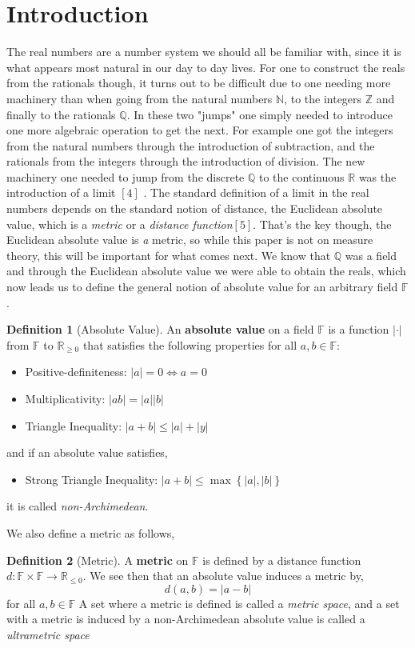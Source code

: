 \documentclass[12pt]{article}
\theoremstyle{definition}
\newtheorem{definition}{Definition}[section]
\theoremstyle{remark}
\newcommand{\zz}{\mathbb Z}   %
\newcommand{\qq}{\mathbb Q}   %
\newcommand{\ff}{\mathbb F}   %
\newcommand{\rr}{\mathbb R}   %
\newcommand{\nn}{\mathbb N}   %
\newcommand{\abs}[1]{\left\lvert#1\right\rvert} %
\renewcommand{\geq}{\geqslant}
\renewcommand{\leq}{\leqslant}
\newcommand{\lrb}[1]{\left[#1\right]}
\newcommand{\lrc}[1]{\left\{#1\right\}}
\begin{document}
\section{Introduction}
The real numbers are a number system we should all be familiar with, since it is what appears most natural in our day to day lives. For one to construct the reals from the rationals though, it turns out to be difficult due to one needing more machinery than when going from the natural numbers $\nn$, to the integers $\zz$ and finally to the rationals $\qq$. In these two "jumps" one simply needed to introduce one more algebraic operation to get the next. For example one got the integers from the natural numbers through the introduction of subtraction, and the rationals from the integers through the introduction of division. The new machinery one needed to jump from the discrete $\qq$ to the continuous $\rr$ was the introduction of a limit $\lrb{4}$ . The standard definition of a limit in the real numbers depends on the standard notion of distance, the Euclidean absolute value, which is a \textit{metric} or a \textit{distance function}$\lrb{5}$. That's the key though, the Euclidean absolute value is \textit{a} metric, so while this paper is not on measure theory, this will be important for what comes next. We know that $\qq$ was a field and through the Euclidean absolute value we were able to obtain the reals, which now leads us to define the general notion of absolute value for an arbitrary field $\ff$.
\newpage
\begin{definition}[Absolute Value]
  An \textbf{absolute value} on a field $\ff$ is a function $\abs{\cdot}$ from $\ff$ to $\rr_{\geq 0}$ that satisfies the following properties for all $a,b \in \ff$:
  \begin{itemize}
    \item[(1)]Positive-definiteness: $\abs{a} = 0 \Longleftrightarrow a = 0$  
    \item[(2)]Multiplicativity: $\abs{ab} = \abs{a} \abs{b}$ 
    \item[(3)]Triangle Inequality: $\abs{a + b} \leq \abs{a} + \abs{y}$    
  \end{itemize}
  and if an absolute value satisfies,
  \begin{itemize}
    \item[(4)] Strong Triangle Inequality: $\abs{a + b} \leq \max\lrc{\abs{a}, \abs{b}}$
  \end{itemize}
  it is called \textit{non-Archimedean}.
\end{definition}
We also define a metric as follows,
\begin{definition}[Metric]
  A \textbf{metric} on $\ff$ is defined by a distance function $d: \ff \times \ff \to \rr_{\leq 0}$. We see then that an absolute value induces a metric by,
  \[d(a,b) = \abs{a - b}\]
  for all $a,b \in \ff$
  A set where a metric is defined is called a \textit{metric space}, and a set with a metric is induced by a non-Archimedean absolute value is called a \textit{ultrametric space}
\end{definition}
\end{document}
